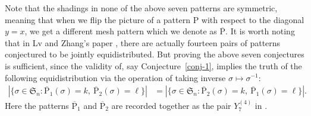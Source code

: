 \documentclass[12pt,reqno]{article}
\numberwithin{equation}{section}
\theoremstyle{plain}
\theoremstyle{definition}
\def\fS{\mathfrak{S}}
\def\rP{\mathrm{P}}
\begin{document}
Note that the shadings in none of the above seven patterns are symmetric, meaning that when we flip the picture of a pattern $\rP$ with respect to the diagonal $y=x$, we get a different mesh pattern which we denote as $\overline{\rP}$. It is worth noting that in Lv and Zhang's paper \cite{LZ25}, there are actually fourteen pairs of patterns conjectured to be jointly equidistributed. But proving the above seven conjectures is sufficient, since the validity of, say Conjecture~\ref{conj-1}, implies the truth of the following equidistribution via the operation of taking inverse $\sigma\mapsto\sigma^{-1}$:
\begin{align*}
|\{\sigma\in\fS_n: \overline{\rP}_1(\sigma)=k,~\overline{\rP}_2(\sigma)=\ell\}| &= |\{\sigma\in\fS_n: \overline{\rP}_2(\sigma)=k,~\overline{\rP}_1(\sigma)=\ell\}|.
\end{align*}
Here the patterns $\overline{\rP}_1$ and $\overline{\rP}_2$ are recorded together as the pair $Y_7^{(4)}$ in \cite[Tab.~11]{LZ25}.
\end{document}
